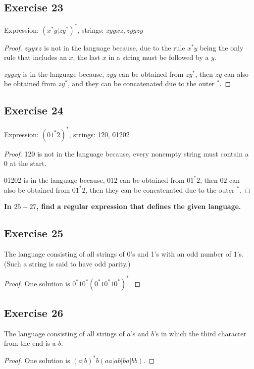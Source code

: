 \documentclass[14pt]{extarticle}
\newcommand{\cy}{\color{cyan}}
\begin{document}
\subsection{Exercise 23}
Expression: \((x^*y | zy^*)^*\), strings: \(zyyxz, zyyzy\)

\begin{proof}
\(zyyxz\) is not in the language because, due to the rule \(x^*y\) being the only rule that includes an \(x\), the last
\(x\) in a string must be followed by a \(y\).

\(zyyzy\) is in the language because, \(zyy\) can be obtained from \(zy^*\), then \(zy\) can also be obtained from \(zy^*\),
and they can be concatenated due to the outer \(^*\).
\end{proof}

\subsection{Exercise 24}
Expression: \((01^*2)^*\), strings: 120, 01202

\begin{proof}
120 is not in the language because, every nonempty string must contain a 0 at the start.

01202 is in the language because, \(012\) can be obtained from \(01^*2\), then \(02\) can also be obtained from \(01^*2\), 
then they can be concatenated due to the outer \(^*\).
\end{proof}

{\bf \cy In \(25-27\), find a regular expression that defines the given language.}

\subsection{Exercise 25}
The language consisting of all strings of 0’s and 1’s with an odd number of 1’s. (Such a string is said to have odd parity.)

\begin{proof}
One solution is \(0^*10^*(0^*10^*10^*)^*\).
\end{proof}

\subsection{Exercise 26}
The language consisting of all strings of \(a\)’s and \(b\)’s in which the third character from the end is a \(b\).

\begin{proof}
One solution is \((a|b)^*b(aa|ab|ba|bb)\).
\end{proof}
\end{document}

